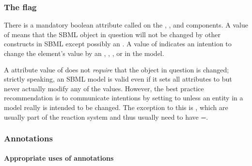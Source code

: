 \subsubsection{The  flag}
\label{sec:bp:constant}

There is a mandatory boolean attribute called  on
the \Compartment, \Species, \SpeciesReference and
\Parameter components.  A value of  means that the SBML
object in question will not be changed by other constructs in SBML
except possibly an \InitialAssignment.  A value of 
indicates an intention to change the element's value by an
\AssignmentRule, \RateRule, \AlgebraicRule, \Reaction or \Event in
the model.

A  attribute value of  does not
\emph{require} that the object in question is changed; strictly
speaking, an SBML model is valid even if it sets all
 attributes to  but never actually
modify any of the values.  However, the best practice
recommendation is to communicate intentions by setting
 to  unless an entity in a model really
is intended to be changed.  The exception to this is \Species,
which are usually part of the reaction system and thus usually
need to have =.


\subsubsection{Annotations}
\label{sec:bp:annotations}

\paragraph{Appropriate uses of annotations}

